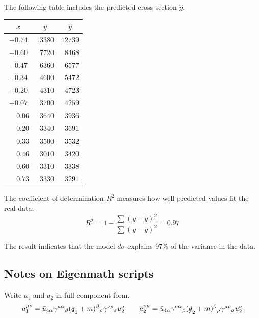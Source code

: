 \documentclass[12pt]{article}
\begin{document}
\noindent
The following table includes the predicted cross section $\hat{y}$.

\begin{center}
\begin{tabular}{|c|c|c|}
\hline
$x$ & $y$ & $\hat{y}$\\
\hline
$-0.74$ & $13380$ & $12739$\\
$-0.60$ & $\phantom{0}7720$ & $\phantom{0}8468$\\
$-0.47$ & $\phantom{0}6360$ & $\phantom{0}6577$\\
$-0.34$ & $\phantom{0}4600$ & $\phantom{0}5472$\\
$-0.20$ & $\phantom{0}4310$ & $\phantom{0}4723$\\
$-0.07$ & $\phantom{0}3700$ & $\phantom{0}4259$\\
$\phantom{+}0.06$ & $\phantom{0}3640$ & $\phantom{0}3936$\\
$\phantom{+}0.20$ & $\phantom{0}3340$ & $\phantom{0}3691$\\
$\phantom{+}0.33$ & $\phantom{0}3500$ & $\phantom{0}3532$\\
$\phantom{+}0.46$ & $\phantom{0}3010$ & $\phantom{0}3420$\\
$\phantom{+}0.60$ & $\phantom{0}3310$ & $\phantom{0}3338$\\
$\phantom{+}0.73$ & $\phantom{0}3330$ & $\phantom{0}3291$\\
\hline
\end{tabular}
\end{center}

\noindent
The coefficient of determination $R^2$ measures how well predicted values fit the real data.
\begin{equation*}
R^2=1-\frac{\sum(y-\hat{y})^2}{\sum(y-\bar{y})^2}=0.97
\end{equation*}

\noindent
The result indicates that the model $d\sigma$ explains 97\% of the variance in the data.

\subsection*{Notes on Eigenmath scripts}
Write $a_1$ and $a_2$ in full component form.
\begin{equation*}
a_1^{\mu\nu}
=\bar{u}_{4\alpha}\gamma^{\mu\alpha}{}_\beta(\slashed{q}_1+m)^\beta{}_\rho\gamma^{\nu\rho}{}_\sigma u_2^\sigma
\qquad
a_2^{\nu\mu}
=\bar{u}_{4\alpha}\gamma^{\nu\alpha}{}_\beta(\slashed{q}_2+m)^\beta{}_\rho\gamma^{\mu\rho}{}_\sigma u_2^\sigma
\end{equation*}
\end{document}

